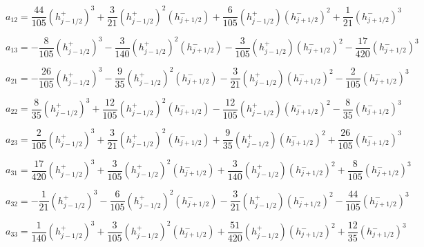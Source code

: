 \documentclass[12pt]{article}
\begin{document}
\[a_{12} = \frac{44}{105}\left(h^+_{j - 1/2}\right)^3  + \frac{3}{21}\left(h^+_{j - 1/2}\right)^2\left(h^-_{j + 1/2}\right) + \frac{6}{105} \left(h^+_{j - 1/2}\right)\left(h^-_{j + 1/2}\right)^2 + \frac{1}{21}  \left(h^-_{j + 1/2}\right)^3 \]

\[a_{13} = -\frac{8}{105}\left(h^+_{j - 1/2}\right)^3  - \frac{3}{140}\left(h^+_{j - 1/2}\right)^2\left(h^-_{j + 1/2}\right) - \frac{3}{105} \left(h^+_{j - 1/2}\right)\left(h^-_{j + 1/2}\right)^2 - \frac{17}{420}  \left(h^-_{j + 1/2}\right)^3 \] 

\[a_{21} = -\frac{26}{105}\left(h^+_{j - 1/2}\right)^3  - \frac{9}{35}\left(h^+_{j - 1/2}\right)^2\left(h^-_{j + 1/2}\right) - \frac{3}{21} \left(h^+_{j - 1/2}\right)\left(h^-_{j + 1/2}\right)^2 - \frac{2}{105}  \left(h^-_{j + 1/2}\right)^3 \]

\[a_{22} = \frac{8}{35}\left(h^+_{j - 1/2}\right)^3  + \frac{12}{105}\left(h^+_{j - 1/2}\right)^2\left(h^-_{j + 1/2}\right) - \frac{12}{105} \left(h^+_{j - 1/2}\right)\left(h^-_{j + 1/2}\right)^2 - \frac{8}{35}  \left(h^-_{j + 1/2}\right)^3 \]


\[a_{23} = \frac{2}{105}\left(h^+_{j - 1/2}\right)^3  + \frac{3}{21}\left(h^+_{j - 1/2}\right)^2\left(h^-_{j + 1/2}\right) + \frac{9}{35} \left(h^+_{j - 1/2}\right)\left(h^-_{j + 1/2}\right)^2 + \frac{26}{105}  \left(h^-_{j + 1/2}\right)^3 \]


\[a_{31} = \frac{17}{420}\left(h^+_{j - 1/2}\right)^3  + \frac{3}{105}\left(h^+_{j - 1/2}\right)^2\left(h^-_{j + 1/2}\right) + \frac{3}{140} \left(h^+_{j - 1/2}\right)\left(h^-_{j + 1/2}\right)^2 + \frac{8}{105}  \left(h^-_{j + 1/2}\right)^3 \]


\[a_{32} = -\frac{1}{21}\left(h^+_{j - 1/2}\right)^3  - \frac{6}{105}\left(h^+_{j - 1/2}\right)^2\left(h^-_{j + 1/2}\right) - \frac{3}{21} \left(h^+_{j - 1/2}\right)\left(h^-_{j + 1/2}\right)^2 - \frac{44}{105}  \left(h^-_{j + 1/2}\right)^3 \]

\[a_{33} = \frac{1}{140}\left(h^+_{j - 1/2}\right)^3  + \frac{3}{105}\left(h^+_{j - 1/2}\right)^2\left(h^-_{j + 1/2}\right) + \frac{51}{420} \left(h^+_{j - 1/2}\right)\left(h^-_{j + 1/2}\right)^2 + \frac{12}{35}  \left(h^-_{j + 1/2}\right)^3 \] 
 
\end{document}
